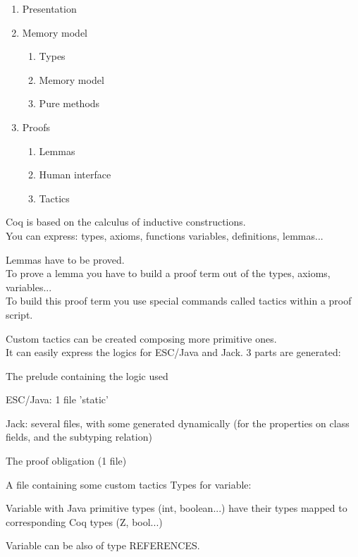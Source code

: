 \begin{enumerate}
\item Presentation
\item Memory model
\begin{enumerate} \small
\item Types
\item Memory model
\item Pure methods
\end{enumerate}
\item Proofs
\begin{enumerate} \small
\item Lemmas
\item Human interface
\item Tactics
\end{enumerate}
\end{enumerate}
\small
Coq is based on the {\purple calculus of inductive constructions}.\\
You can express: types, axioms, functions
variables, definitions, {\purple lemmas}...

Lemmas have to be proved.\\
To prove a lemma you have to build a {\purple proof term} out of the types, 
axioms, variables... \\
To build this proof term you use special commands 
called {\purple tactics} within a proof script.

{\purple Custom tactics} can be created composing more primitive ones.\\

It can easily express the logics for ESC/Java and Jack.
3 parts are generated:
\blist 
\item The {\purple prelude} containing the logic used 
\blist \small
\item ESC/Java: 1 file 'static'
\item Jack: several files, with some generated dynamically
 (for the properties on class fields, and the subtyping relation)
\elist
\item The {\purple proof obligation} (1 file)
\item A file containing some {\purple custom tactics}
\elist
{}\small
Types for variable:
\blist
\item Variable with Java {\purple primitive types} (int,  boolean...) 
have their types  mapped to corresponding {\purple Coq types} (Z, bool...)
\item Variable can be also of type {\purple REFERENCES}.
\elist


